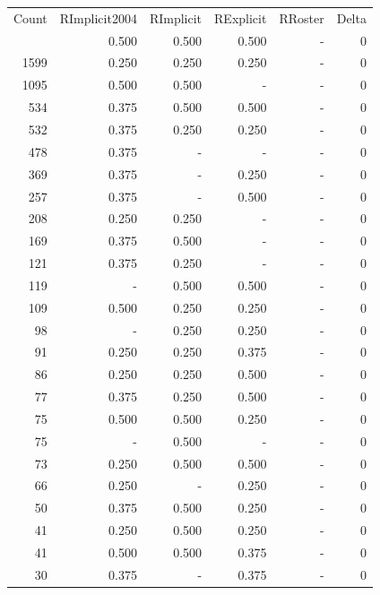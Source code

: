 \documentclass[a4paper]{article}\usepackage[]{graphicx}\usepackage[]{color}
\begin{document}
\begin{table}[ht]
\centering
\begin{tabular}{rrrrrr}
  \hline
Count & RImplicit2004 & RImplicit & RExplicit & RRoster & Delta \\ 
  \rowcolor{goodColor}  \hline
4406 & 0.500 & 0.500 & 0.500 & - & 0 \\ 
   \rowcolor{goodColor} 1599 & 0.250 & 0.250 & 0.250 & - & 0 \\ 
  1095 & 0.500 & 0.500 & - & - & 0 \\ 
   \rowcolor{goodColor} 534 & 0.375 & 0.500 & 0.500 & - & 0 \\ 
   \rowcolor{goodColor} 532 & 0.375 & 0.250 & 0.250 & - & 0 \\ 
   \rowcolor{nullColor} 478 & 0.375 & - & - & - & 0 \\ 
   \rowcolor{sosoColor} 369 & 0.375 & - & 0.250 & - & 0 \\ 
   \rowcolor{sosoColor} 257 & 0.375 & - & 0.500 & - & 0 \\ 
  208 & 0.250 & 0.250 & - & - & 0 \\ 
  169 & 0.375 & 0.500 & - & - & 0 \\ 
  121 & 0.375 & 0.250 & - & - & 0 \\ 
   \rowcolor{goodColor} 119 & - & 0.500 & 0.500 & - & 0 \\ 
   \rowcolor{goodColor} 109 & 0.500 & 0.250 & 0.250 & - & 0 \\ 
   \rowcolor{goodColor} 98 & - & 0.250 & 0.250 & - & 0 \\ 
  91 & 0.250 & 0.250 & 0.375 & - & 0 \\ 
   \rowcolor{badColor} 86 & 0.250 & 0.250 & 0.500 & - & 0 \\ 
   \rowcolor{badColor} 77 & 0.375 & 0.250 & 0.500 & - & 0 \\ 
   \rowcolor{badColor} 75 & 0.500 & 0.500 & 0.250 & - & 0 \\ 
  75 & - & 0.500 & - & - & 0 \\ 
   \rowcolor{goodColor} 73 & 0.250 & 0.500 & 0.500 & - & 0 \\ 
   \rowcolor{sosoColor} 66 & 0.250 & - & 0.250 & - & 0 \\ 
   \rowcolor{badColor} 50 & 0.375 & 0.500 & 0.250 & - & 0 \\ 
   \rowcolor{badColor} 41 & 0.250 & 0.500 & 0.250 & - & 0 \\ 
  41 & 0.500 & 0.500 & 0.375 & - & 0 \\ 
   \rowcolor{sosoColor} 30 & 0.375 & - & 0.375 & - & 0 \\ 

\end{tabular}
\end{table}
\end{document}
